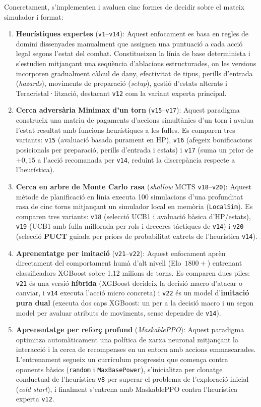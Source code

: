Concretament, s'implementen i avaluen cinc formes de decidir sobre el mateix simulador i format:
\begin{enumerate}
    \item \textbf{Heurístiques expertes} (\texttt{v1}--\texttt{v14}): Aquest enfocament es basa en regles de domini dissenyades manualment que assignen una puntuació a cada acció legal segons l'estat del combat. Constitueixen la línia de base determinista i s'estudien mitjançant una seqüència d'ablacions estructurades, on les versions incorporen gradualment càlcul de dany, efectivitat de tipus, perills d'entrada (\emph{hazards}), moviments de preparació (\emph{setup}), gestió d'estats alterats i Teracristal·lització, destacant \texttt{v12} com la variant experta principal.
    \item \textbf{Cerca adversària Minimax d'un torn} (\texttt{v15}--\texttt{v17}): Aquest paradigma construeix una matriu de pagaments d'accions simultànies d'un torn i avalua l'estat resultat amb funcions heurístiques a les fulles. Es comparen tres variants: \texttt{v15} (avaluació basada purament en HP), \texttt{v16} (afegeix bonificacions posicionals per preparació, perills d'entrada i estats) i \texttt{v17} (suma un prior de $+0{,}15$ a l'acció recomanada per \texttt{v14}, reduint la discrepància respecte a l'heurística).
    \item \textbf{Cerca en arbre de Monte Carlo rasa} (\emph{shallow} MCTS \texttt{v18}--\texttt{v20}): Aquest mètode de planificació en línia executa 100 simulacions d'una profunditat rasa de cinc torns mitjançant un simulador local en memòria (\texttt{LocalSim}). Es comparen tres variants: \texttt{v18} (selecció UCB1 i avaluació bàsica d'HP/estats), \texttt{v19} (UCB1 amb fulla millorada per rols i dreceres tàctiques de \texttt{v14}) i \texttt{v20} (selecció \textbf{PUCT} guiada per priors de probabilitat extrets de l'heurística \texttt{v14}).
    \item \textbf{Aprenentatge per imitació} (\texttt{v21}--\texttt{v22}): Aquest enfocament aprèn directament del comportament humà d'alt nivell (Elo~$1800+$) entrenant classificadors XGBoost sobre 1,12 milions de torns. Es comparen dues piles: \texttt{v21} és una versió \textbf{híbrida} (XGBoost decideix la decisió macro d'atacar o canviar, i \texttt{v14} executa l'acció micro concreta) i \texttt{v22} és un model d'\textbf{imitació pura dual} (executa dos caps XGBoost: un per a la decisió macro i un segon model per avaluar atributs de moviments, sense dependre de \texttt{v14}).
    \item \textbf{Aprenentatge per reforç profund} (\emph{MaskablePPO}): Aquest paradigma optimitza automàticament una política de xarxa neuronal mitjançant la interacció i la cerca de recompenses en un entorn amb accions emmascarades. L'entrenament segueix un currículum progressiu que comença contra oponents bàsics (\texttt{random} i \texttt{MaxBasePower}), s'inicialitza per clonatge conductual de l'heurística \texttt{v8} per superar el problema de l'exploració inicial (\emph{cold start}), i finalment s'entrena amb MaskablePPO contra l'heurística experta \texttt{v12}.
\end{enumerate}

